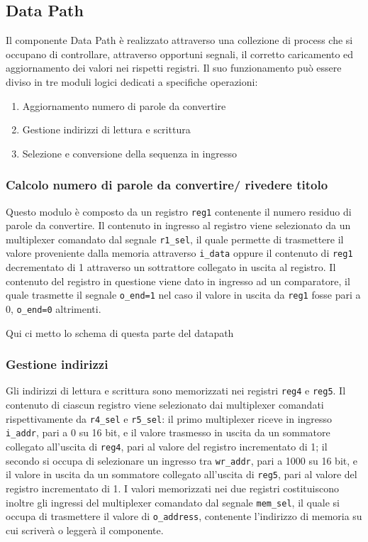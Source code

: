 \documentclass[a4paper]{article}
\begin{document}
\subsection{Data Path}
Il componente Data Path è realizzato attraverso una collezione di process che si occupano di controllare, attraverso opportuni segnali, il corretto caricamento ed aggiornamento dei valori nei rispetti registri. Il suo funzionamento può essere diviso in tre moduli logici dedicati a specifiche operazioni:
\begin{enumerate}
	\item Aggiornamento numero di parole da convertire
	\item Gestione indirizzi di lettura e scrittura
	\item Selezione e conversione della sequenza in ingresso 
\end{enumerate}

\subsubsection{Calcolo numero di parole da convertire/ rivedere titolo}
Questo modulo è composto da un registro 	\texttt{reg1} contenente il numero residuo di parole da convertire. Il contenuto in ingresso al registro viene selezionato da un multiplexer comandato dal segnale \texttt{r1\_sel}, il quale permette di trasmettere il valore proveniente dalla memoria attraverso \texttt{i\_data} oppure il contenuto di \texttt{reg1} decrementato di 1 attraverso un sottrattore collegato in uscita al registro. Il contenuto del registro in questione viene dato in ingresso ad un comparatore, il quale trasmette il segnale \texttt{o\_end=1} nel caso il valore in uscita da \texttt{reg1} fosse pari a 0, \texttt{o\_end=0} altrimenti.
\newline

Qui ci metto lo schema di questa parte del datapath
\newline

\subsubsection{Gestione indirizzi}
Gli indirizzi di lettura e scrittura sono memorizzati nei registri \texttt{reg4} e \texttt{reg5}. Il contenuto di ciascun registro viene selezionato dai multiplexer comandati rispettivamente da \texttt{r4\_sel} e \texttt{r5\_sel}: il primo multiplexer riceve in ingresso \texttt{i\_addr}, pari a 0 su 16 bit, e il valore trasmesso in uscita da un sommatore collegato all'uscita di \texttt{reg4}, pari al valore del registro incrementato di 1; il secondo si occupa di selezionare un ingresso tra \texttt{wr\_addr}, pari a 1000 su 16 bit, e il valore in uscita da un sommatore collegato all'uscita di \texttt{reg5}, pari al valore del registro incrementato di 1. I valori memorizzati nei due registri costituiscono inoltre gli ingressi del multiplexer comandato dal segnale \texttt{mem\_sel}, il quale si occupa di trasmettere il valore di \texttt{o\_address}, contenente l'indirizzo di memoria su cui scriverà o leggerà il componente.
\newline
\end{document}
